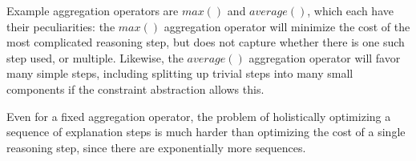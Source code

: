 Example aggregation operators are $max()$ and $average()$, which each have their peculiarities: the $max()$ aggregation operator will minimize the cost of the most complicated reasoning step, but does not capture whether there is one such step used, or multiple. Likewise, the $average()$ aggregation operator will favor many simple steps, including splitting up trivial steps into many small components if the constraint abstraction allows this.

Even for a fixed aggregation operator, the problem of holistically optimizing a sequence of explanation steps is much harder than optimizing the cost of a single reasoning step, since there are exponentially more sequences. 









